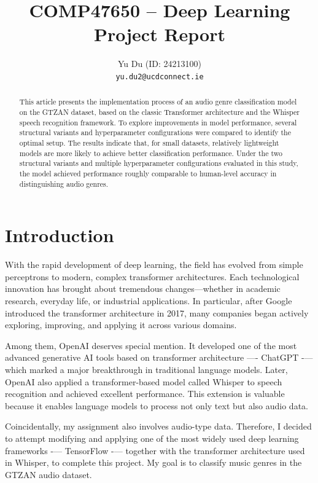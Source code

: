 \documentclass{article}
\title{COMP47650 – Deep Learning Project Report}
\author{
  Yu Du (ID: 24213100) \\
  \texttt{yu.du2@ucdconnect.ie} \\
}
\date{}
\begin{document}
  \maketitle

  \begin{abstract}

    This article presents the implementation process of an audio genre classification model on the GTZAN dataset, based on the classic Transformer architecture and the Whisper speech recognition framework. To explore improvements in model performance, several structural variants and hyperparameter configurations were compared to identify the optimal setup. The results indicate that, for small datasets, relatively lightweight models are more likely to achieve better classification performance. Under the two structural variants and multiple hyperparameter configurations evaluated in this study, the model achieved performance roughly comparable to human-level accuracy in distinguishing audio genres.

  \end{abstract}

  \section{Introduction}

    With the rapid development of deep learning, the field has evolved from simple perceptrons to modern, complex transformer architectures. Each technological innovation has brought about tremendous changes—whether in academic research, everyday life, or industrial applications. In particular, after Google introduced the transformer architecture in 2017, many companies began actively exploring, improving, and applying it across various domains.

    Among them, OpenAI deserves special mention. It developed one of the most advanced generative AI tools based on transformer architecture —- ChatGPT -— which marked a major breakthrough in traditional language models. Later, OpenAI also applied a transformer-based model called Whisper to speech recognition and achieved excellent performance. This extension is valuable because it enables language models to process not only text but also audio data.
    
    Coincidentally, my assignment also involves audio-type data. Therefore, I decided to attempt modifying and applying one of the most widely used deep learning frameworks -— TensorFlow -— together with the transformer architecture used in Whisper, to complete this project. My goal is to classify music genres in the GTZAN audio dataset.
    
\end{document}
